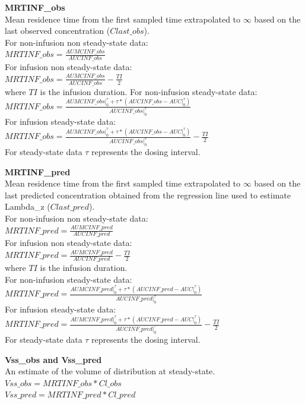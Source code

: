 \documentclass[12pt,]{krantz}
\begin{document}
\textbf{MRTINF\_obs}\\
Mean residence time from the first sampled time extrapolated to \({\infty}\) based on the last observed concentration (\({Clast\_obs}\)).\\
For non-infusion non steady-state data:\\
\(MRTINF\_obs = \frac{AUMCINF\_obs}{AUCINF\_obs}\)\\
For infusion non steady-state data:\\
\(MRTINF\_obs = \frac{AUMCINF\_obs}{AUCINF\_obs}-\frac{TI}{2}\)\\
where \({TI}\) is the infusion duration. For non-infusion steady-state data:\\
\(MRTINF\_obs = \frac{AUMCINF\_obs|_{0}^{\tau}+\tau*(AUCINF\_obs-AUC|_{0}^{\tau})}{AUCINF\_obs|_{0}^{\tau}}\)\\
For infusion steady-state data:\\
\(MRTINF\_obs = \frac{AUMCINF\_obs|_{0}^{\tau}+\tau*(AUCINF\_obs-AUC|_{0}^{\tau})}{AUCINF\_obs|_{0}^{\tau}}-\frac{TI}{2}\)\\
For steady-state data \({\tau}\) represents the dosing interval.

\textbf{MRTINF\_pred}\\
Mean residence time from the first sampled time extrapolated to \({\infty}\) based on the last predicted concentration obtained from the regression line used to estimate Lambda\_z (\({Clast\_pred}\)).\\
For non-infusion non steady-state data:\\
\(MRTINF\_pred = \frac{AUMCINF\_pred}{AUCINF\_pred}\)\\
For infusion non steady-state data:\\
\(MRTINF\_pred = \frac{AUMCINF\_pred}{AUCINF\_pred}-\frac{TI}{2}\)\\
where \({TI}\) is the infusion duration.\\
For non-infusion steady-state data:\\
\(MRTINF\_pred = \frac{AUMCINF\_pred|_{0}^{\tau}+\tau*(AUCINF\_pred-AUC|_{0}^{\tau})}{AUCINF\_pred|_{0}^{\tau}}\)\\
For infusion steady-state data:\\
\(MRTINF\_pred = \frac{AUMCINF\_pred|_{0}^{\tau}+\tau*(AUCINF\_pred-AUC|_{0}^{\tau})}{AUCINF\_pred|_{0}^{\tau}}-\frac{TI}{2}\)\\
For steady-state data \({\tau}\) represents the dosing interval.

\textbf{Vss\_obs and Vss\_pred}\\
An estimate of the volume of distribution at steady-state.\\
\(Vss\_obs = MRTINF\_obs*Cl\_obs\)\\
\(Vss\_pred = MRTINF\_pred*Cl\_pred\)
\end{document}
